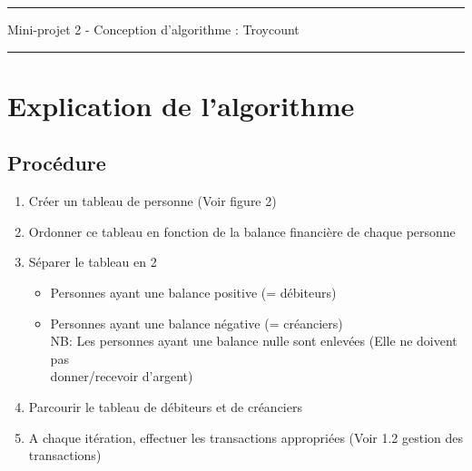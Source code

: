 \documentclass[12pt, a4paper, table]{article}
\begin{document}
\begin{Large} \begin{center}
\vspace{-0.83cm}
\noindent \rule{15cm}{.9pt} 
\vspace{-0.33cm}
	\textsf{Mini-projet 2 -  Conception d’algorithme : Troycount}\\
	\rule{15cm}{.9pt} 
\end{center} \end{Large} 
\vspace{-0.7cm}
\section{Explication de l'algorithme}
\vspace{-0.3cm}
\subsection{Procédure}
\begin{enumerate}
\item Créer un tableau de personne (Voir figure 2)
\item Ordonner ce tableau en fonction de la balance financière de chaque personne
\item Séparer le tableau en 2
\begin{itemize}
\item Personnes ayant une balance positive (= débiteurs)
\item Personnes ayant une balance négative (= créanciers) \medskip \\
NB: Les personnes ayant une balance nulle sont enlevées (Elle ne doivent pas \\ donner/recevoir d'argent)
\end{itemize}
\item Parcourir le tableau de débiteurs et de créanciers
\item A chaque itération, effectuer les transactions appropriées (Voir 1.2 gestion des transactions)
\end{enumerate}
\end{document}
